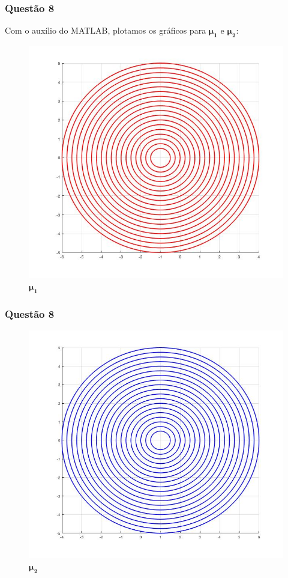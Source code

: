 \documentclass{beamer}\usepackage[]{graphicx}\usepackage[]{color}
\begin{document}
		\begin{frame}
			\frametitle{Questão 8}
			Com o auxílio do MATLAB, plotamos os gráficos para $\boldsymbol{\mu_{1}}$ e $\boldsymbol{\mu_{2}}$:
			\begin{figure}[h]
				\centering
				\includegraphics[scale=0.3]{lista2_1.jpeg}
				\caption{$\boldsymbol{\mu_{1}}$}
			\end{figure}
		\end{frame}
	
		\begin{frame}
			\frametitle{Questão 8}
			\begin{figure}[h]
				\centering
				\includegraphics[scale=0.3]{lista2_2.jpeg}
				\caption{$\boldsymbol{\mu_{2}}$}
			\end{figure}
		\end{frame}
		
\end{document}
